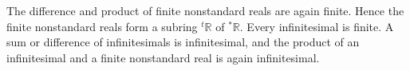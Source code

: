 The difference and product of finite nonstandard reals are again finite. Hence the finite nonstandard reals form a subring ${}^t\mathbb{R}$ of $^*\mathbb{R}$. Every infinitesimal is finite. A sum or difference of infinitesimals is infinitesimal, and the product of an infinitesimal and a finite nonstandard real is again infinitesimal.
